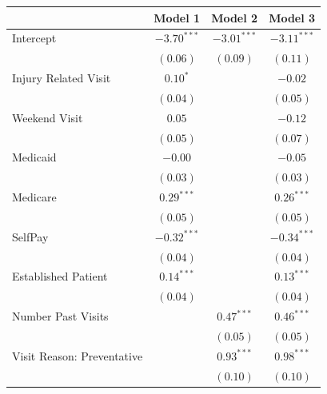 \documentclass[12pt,twoside]{reedthesis}
\begin{document}
  \singlespacing
  
  \begin{table}
  \begin{center}
  \begin{small}
  \begin{tabular}{l c c c }
  \hline
   & Model 1 & Model 2 & Model 3 \\
  \hline
  Intercept                     & $-3.70^{***}$ & $-3.01^{***}$ & $-3.11^{***}$ \\
                                & $(0.06)$      & $(0.09)$      & $(0.11)$      \\
  Injury Related Visit          & $0.10^{*}$    &               & $-0.02$       \\
                                & $(0.04)$      &               & $(0.05)$      \\
  Weekend Visit                 & $0.05$        &               & $-0.12$       \\
                                & $(0.05)$      &               & $(0.07)$      \\
  Medicaid                      & $-0.00$       &               & $-0.05$       \\
                                & $(0.03)$      &               & $(0.03)$      \\
  Medicare                      & $0.29^{***}$  &               & $0.26^{***}$  \\
                                & $(0.05)$      &               & $(0.05)$      \\
  SelfPay                       & $-0.32^{***}$ &               & $-0.34^{***}$ \\
                                & $(0.04)$      &               & $(0.04)$      \\
  Established Patient           & $0.14^{***}$  &               & $0.13^{***}$  \\
                                & $(0.04)$      &               & $(0.04)$      \\
  Number Past Visits            &               & $0.47^{***}$  & $0.46^{***}$  \\
                                &               & $(0.05)$      & $(0.05)$      \\
  Visit Reason: Preventative    &               & $0.93^{***}$  & $0.98^{***}$  \\
                                &               & $(0.10)$      & $(0.10)$      \\

\end{tabular}
\end{small}
\end{center}
\end{table}
\end{document}
